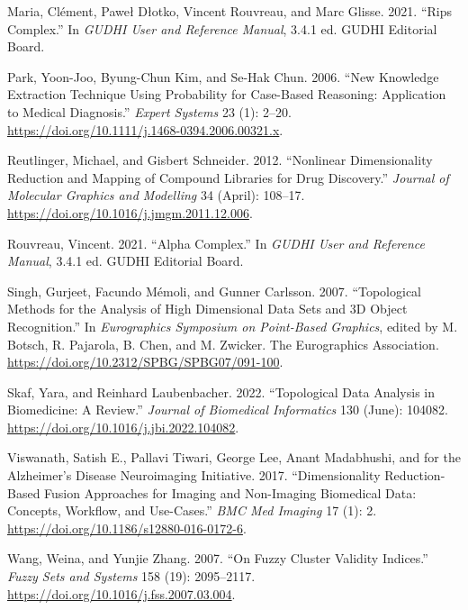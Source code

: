 \documentclass{article}
\newlength{\cslhangindent}
\newlength{\cslentryspacingunit} %
\newenvironment{CSLReferences}[2] %
 {%
  \setlength{\parindent}{0pt}
  \ifodd #1
  \let\oldpar\par
  \def\par{\hangindent=\cslhangindent\oldpar}
  \fi
  \setlength{\parskip}{#2\cslentryspacingunit}
 }%
 {}
\begin{document}
\begin{CSLReferences}{1}{0}
\leavevmode{}%
Maria, Clément, Paweł Dłotko, Vincent Rouvreau, and Marc Glisse. 2021.
{``Rips Complex.''} In \emph{{GUDHI User} and {Reference Manual}}, 3.4.1
ed. {GUDHI Editorial Board}.

\leavevmode{}%
Park, Yoon-Joo, Byung-Chun Kim, and Se-Hak Chun. 2006. {``New Knowledge
Extraction Technique Using Probability for Case-Based Reasoning:
Application to Medical Diagnosis.''} \emph{Expert Systems} 23 (1):
2--20. \url{https://doi.org/10.1111/j.1468-0394.2006.00321.x}.

\leavevmode{}%
Reutlinger, Michael, and Gisbert Schneider. 2012. {``Nonlinear
Dimensionality Reduction and Mapping of Compound Libraries for Drug
Discovery.''} \emph{Journal of Molecular Graphics and Modelling} 34
(April): 108--17. \url{https://doi.org/10.1016/j.jmgm.2011.12.006}.

\leavevmode{}%
Rouvreau, Vincent. 2021. {``Alpha Complex.''} In \emph{{GUDHI User} and
{Reference Manual}}, 3.4.1 ed. {GUDHI Editorial Board}.

\leavevmode{}%
Singh, Gurjeet, Facundo Mémoli, and Gunner Carlsson. 2007.
{``Topological {Methods} for the {Analysis} of {High Dimensional Data
Sets} and {3D Object Recognition}.''} In \emph{Eurographics {Symposium}
on {Point-Based Graphics}}, edited by M. Botsch, R. Pajarola, B. Chen,
and M. Zwicker. {The Eurographics Association}.
\url{https://doi.org/10.2312/SPBG/SPBG07/091-100}.

\leavevmode{}%
Skaf, Yara, and Reinhard Laubenbacher. 2022. {``Topological Data
Analysis in Biomedicine: {A} Review.''} \emph{Journal of Biomedical
Informatics} 130 (June): 104082.
\url{https://doi.org/10.1016/j.jbi.2022.104082}.

\leavevmode{}%
Viswanath, Satish E., Pallavi Tiwari, George Lee, Anant Madabhushi, and
for the Alzheimer's Disease Neuroimaging Initiative. 2017.
{``Dimensionality Reduction-Based Fusion Approaches for Imaging and
Non-Imaging Biomedical Data: Concepts, Workflow, and Use-Cases.''}
\emph{BMC Med Imaging} 17 (1): 2.
\url{https://doi.org/10.1186/s12880-016-0172-6}.

\leavevmode{}%
Wang, Weina, and Yunjie Zhang. 2007. {``On Fuzzy Cluster Validity
Indices.''} \emph{Fuzzy Sets and Systems} 158 (19): 2095--2117.
\url{https://doi.org/10.1016/j.fss.2007.03.004}.


\end{CSLReferences}
\end{document}
